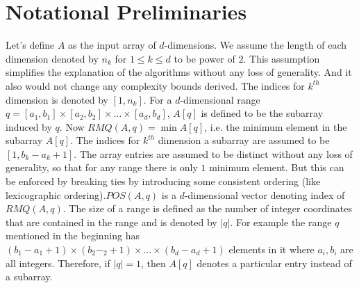\section{Notational Preliminaries}
Let's define $A$ as the input array of $d$-dimensions. We assume the length of each dimension denoted by $n_k$ for $1\leq k\leq d$ to be power of $2$. This assumption simplifies the explanation of the algorithms without any loss of generality. And it also would not change any complexity bounds derived. The indices for $k^{th}$ dimension is denoted by $[1,n_k]$. For a $d$-dimensional range $q=[a_1,b_1]\times[a_2,b_2]\times\ldots\times[a_d,b_d]$, $A[q]$ is defined to be the subarray induced by $q$. Now $RMQ(A,q)=\min A[q]$, i.e. the minimum element in the subarray $A[q]$. The indices for $k^{th}$ dimension a subarray are assumed to be $[1,b_k-a_k+1]$. The array entries are assumed to be distinct without any loss of generality, so that for any range there is only $1$ minimum element. But this can be enforced by breaking ties by introducing some consistent ordering (like lexicographic ordering).$POS(A,q)$ is a $d$-dimensional vector denoting index of $RMQ(A,q)$. The size of a range is defined as the number of integer coordinates that are contained in the range and is denoted by $\left\vert q\right\vert$. For example the range $q$ mentioned in the beginning has $(b_1-a_1+1)\times(b_2-_2+1)\times\ldots\times(b_d-a_d+1)$ elements in it where $a_i,b_i$ are all integers. Therefore, if $\left\vert q\right\vert =1$, then $A[q]$ denotes a particular entry instead of a subarray.
